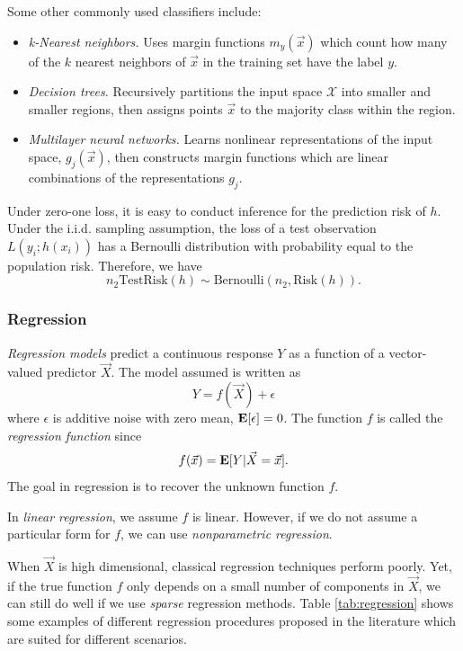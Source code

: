 Some other commonly used classifiers include:
\begin{itemize}
\item \emph{k-Nearest neighbors.}  Uses margin functions
  $m_y(\vec{x})$ which count how many of the $k$ nearest neighbors of
  $\vec{x}$ in the training set have the label $y$.
\item \emph{Decision trees.}  Recursively partitions the input space
  $\mathcal{X}$ into smaller and smaller regions, then assigns points
  $\vec{x}$ to the majority class within the region.
\item \emph{Multilayer neural networks.}  Learns nonlinear
  representations of the input space, $g_j(\vec{x})$, then constructs
  margin functions which are linear combinations of the
  representations $g_j$.
\end{itemize}


Under zero-one loss, it is easy to conduct inference for the
prediction risk of $h$.  Under the i.i.d. sampling assumption, the
loss of a test observation $L(y_i; h(x_i))$ has a Bernoulli
distribution with probability equal to the population risk.  Therefore,
we have
\[
n_2 \text{TestRisk}(h) \sim \text{Bernoulli}(n_2, \text{Risk}(h)).
\]


\subsubsection{Regression}

\emph{Regression models} predict a continuous response $Y$ as a function of a vector-valued predictor $\vec{X}$.
The model assumed is written as
\[
Y = f(\vec{X}) + \epsilon
\]
where $\epsilon$ is additive noise with zero mean, $\textbf{E}[\epsilon] = 0$.
The function $f$ is called the \emph{regression function} since
\[
f(\vec{x}) = \textbf{E}[Y|\vec{X} = \vec{x}].
\]
The goal in regression is to recover the unknown function $f$.

In \emph{linear regression}, we assume $f$ is linear. However, if we
do not assume a particular form for $f$, we can use
\emph{nonparametric regression}.

When $\vec{X}$ is high dimensional, classical regression techniques
perform poorly.  Yet, if the true function $f$ only depends on a small
number of components in $\vec{X}$, we can still do well if we use
\emph{sparse} regression methods. Table \ref{tab:regression} shows
some examples of different regression procedures proposed in the
literature which are suited for different scenarios.

